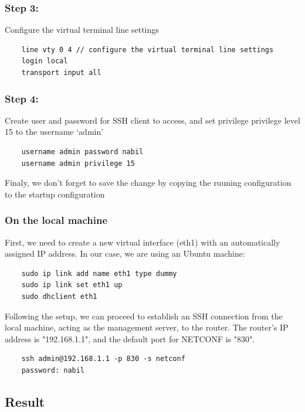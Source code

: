 \subsubsection{Step 3:}
Configure the virtual terminal line settings
\begin{verbatim}
    line vty 0 4 // configure the virtual terminal line settings
    login local
    transport input all
\end{verbatim}
\subsubsection{Step 4:}
Create user and password for SSH client to access, and set privilege privilege level 15 to the username ‘admin’
\begin{verbatim}
    username admin password nabil 
    username admin privilege 15 
\end{verbatim}
\indent Finaly, we don't forget to save the change by copying the ruuning configuration to the startup configuration
\subsubsection{On the local machine}
\indent First, we need to create a new virtual interface (eth1) with an automatically assigned IP address. In our case, we are using an Ubuntu machine:
\begin{verbatim}
    sudo ip link add name eth1 type dummy
    sudo ip link set eth1 up
    sudo dhclient eth1
\end{verbatim}
Following the setup, we can proceed to establish an SSH connection from the local machine, acting as the management server, to the router. The router's IP address is "192.168.1.1", and the default port for NETCONF is "830".
\begin{verbatim}
    ssh admin@192.168.1.1 -p 830 -s netconf 
    password: nabil
\end{verbatim}
\subsection{Result}









